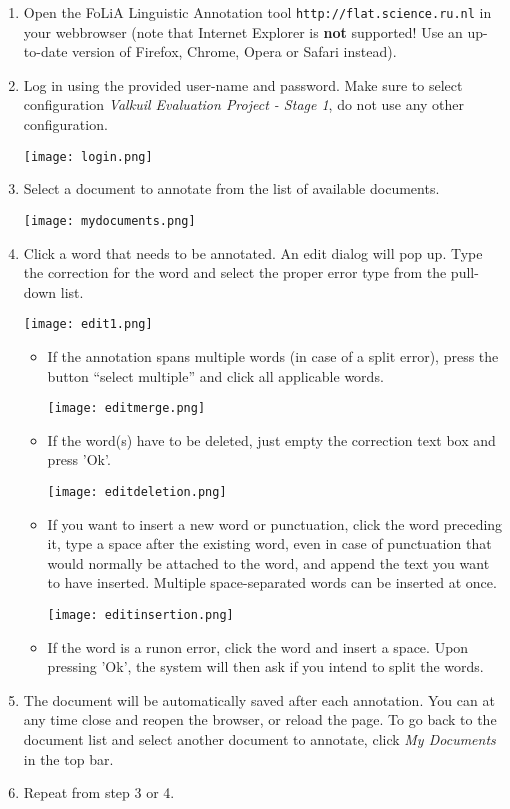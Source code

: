 \documentclass[a4paper,11pt]{article}
\begin{document}
\begin{enumerate}
\item Open the FoLiA Linguistic Annotation tool
  \texttt{http://flat.science.ru.nl} in your webbrowser (note that
  Internet Explorer is \textbf{not} supported! Use an up-to-date version of
  Firefox, Chrome, Opera or Safari instead). 
\item Log in using the provided user-name and password. Make sure to select configuration
  \emph{Valkuil Evaluation Project - Stage 1}, do not use any other
  configuration.
  \begin{center}
    \texttt{[image: login.png]}
  \end{center}
\item Select a document to annotate from the list of available documents.
  \begin{center}
    \texttt{[image: mydocuments.png]}
  \end{center}
\item Click a word that needs to be annotated. An edit dialog will pop up.
  Type the correction for the word and select the proper error type from the
  pull-down list.
  \begin{center}
    \texttt{[image: edit1.png]}
  \end{center}
\begin{itemize}
  \item If the annotation spans multiple
  words (in case of a split error), press the button ``select multiple'' and
  click all applicable words.
  \begin{center}
    \texttt{[image: editmerge.png]}
  \end{center}
  \item If the word(s) have to be deleted, just empty the correction text box
    and press 'Ok'.
  \begin{center}
    \texttt{[image: editdeletion.png]}
  \end{center}
  \item If you want to insert a new word or punctuation, click the word
    preceding it, type a space after the existing word, even in case of
    punctuation that would normally be attached to the word, and append the text you
    want to have inserted. Multiple space-separated words can be inserted at
    once.
  \begin{center}
    \texttt{[image: editinsertion.png]}
  \end{center}
  \item If the word is a runon error, click the word and insert a space. Upon
    pressing 'Ok', the
    system will then ask if you intend to split the words.
\end{itemize}
\item The document will be automatically saved after each annotation. You can
  at any time close and reopen the browser, or reload the page. To go back to
  the document list and select another document to annotate, click \emph{My
  Documents} in the top bar.
\item Repeat from step 3 or 4.
\end{enumerate}
\end{document}
